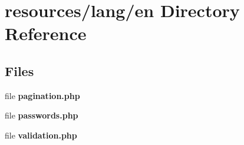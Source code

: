 \section{resources/lang/en Directory Reference}
\label{dir_bce4881899411fefc2a69155a2d35f46}
\subsection*{Files}
\begin{DoxyCompactItemize}
\item 
file {\bf pagination.\+php}
\item 
file {\bf passwords.\+php}
\item 
file {\bf validation.\+php}
\end{DoxyCompactItemize}
